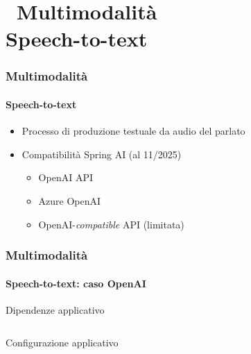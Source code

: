 \section{\faWrench\ Multimodalità\\\small{Speech-to-text}} %
\label{sec:spring-stt}
%
\begin{frame}[t,fragile] \frametitle{Multimodalità}
    \framesubtitle{Speech-to-text}
    {\footnotesize
    \begin{itemize}[leftmargin=10pt,align=right]
        \item[\alert{\faArrowCircleRight}] Processo di produzione testuale da audio del parlato
        \item[\alert{\faArrowCircleRight}] Compatibilità Spring AI (al 11/2025)
        \begin{itemize}[leftmargin=10pt,align=right]
            \item[\alert{\faArrowCircleRight}] OpenAI API
            \item[\alert{\faArrowCircleRight}] Azure OpenAI
            \item[\alert{\faArrowCircleRight}] OpenAI-\textit{compatible} API (limitata)
        \end{itemize}
    \end{itemize}
    }
\end{frame}    
%
\begin{frame}[t,fragile] \frametitle{Multimodalità}
    \framesubtitle{Speech-to-text: caso OpenAI}
    {\footnotesize
        \begin{block}{Dipendenze applicativo}
			{\tiny\inputminted{xml}{code/pom.xml}}
    	\end{block}
        \begin{block}{Configurazione applicativo}
			{\tiny\inputminted{yaml}{code/application.yml}}
    	\end{block}       
    }
\end{frame}
%
